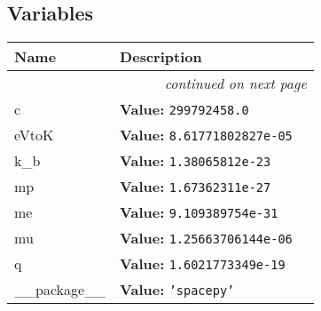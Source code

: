 
  \subsection{Variables}

    \vspace{-1cm}
\hspace{\varindent}\begin{longtable}{|p{\varnamewidth}|p{\vardescrwidth}|l}
\cline{1-2}
\cline{1-2} \centering \textbf{Name} & \centering \textbf{Description}& \\
\cline{1-2}
\endhead\cline{1-2}\multicolumn{3}{r}{\small\textit{continued on next page}}\\\endfoot\cline{1-2}
\endlastfoot\raggedright c\- & \raggedright \textbf{Value:} 
{\tt 299792458.0}&\\
\cline{1-2}
\raggedright e\-V\-t\-o\-K\- & \raggedright \textbf{Value:} 
{\tt 8.61771802827e-05}&\\
\cline{1-2}
\raggedright k\-\_\-b\- & \raggedright \textbf{Value:} 
{\tt 1.38065812e-23}&\\
\cline{1-2}
\raggedright m\-p\- & \raggedright \textbf{Value:} 
{\tt 1.67362311e-27}&\\
\cline{1-2}
\raggedright m\-e\- & \raggedright \textbf{Value:} 
{\tt 9.109389754e-31}&\\
\cline{1-2}
\raggedright m\-u\-0\- & \raggedright \textbf{Value:} 
{\tt 1.25663706144e-06}&\\
\cline{1-2}
\raggedright q\- & \raggedright \textbf{Value:} 
{\tt 1.6021773349e-19}&\\
\cline{1-2}
\raggedright \_\-\_\-p\-a\-c\-k\-a\-g\-e\-\_\-\_\- & \raggedright \textbf{Value:} 
{\tt \texttt{'}\texttt{spacepy}\texttt{'}}&\\
\cline{1-2}
\end{longtable}

